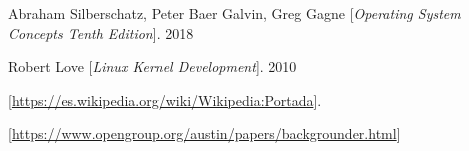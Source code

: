 \documentclass[a4paper, 11pt, oneside]{article}
\begin{document}
\begin{thebibliography}{9}
Abraham Silberschatz, Peter Baer Galvin, Greg Gagne
[\textit{Operating System Concepts Tenth Edition}]. 
2018

Robert Love
[\textit{Linux Kernel Development}]. 
2010

[\url{https://es.wikipedia.org/wiki/Wikipedia:Portada}]. 

[\url{https://www.opengroup.org/austin/papers/backgrounder.html}]
\end{thebibliography}
\end{document}
